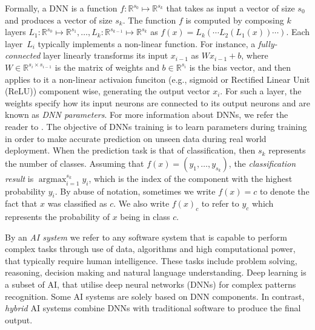 \documentclass[10pt, conference, a4paper, final]{IEEEtran}
\begin{document}
Formally, a DNN is a function $f\colon\mathbb{R}^{s_0}\mapsto \mathbb{R}^{s_k}$ that takes as input a vector of size $s_0$ and produces a vector of size $s_k$. The function $f$ is computed by composing $k$ layers $L_1\colon\mathbb{R}^{s_0} \mapsto\mathbb{R}^{s_1}, \dots, L_k\colon\mathbb{R}^{s_{k-1}}\mapsto\mathbb{R}^{s_k}$ as $f(x) = L_k(\cdots L_2(L_1(x))\cdots)$.
%
Each layer~$L_i$ typically implements a non-linear function. For instance, a \emph{fully-connected} layer linearly transforms its input $x_{i-1}$ as $W x_{i-1} + b$, where $W\in\mathbb{R}^{s_{i} \times s_{i-1}}$ is the matrix of weights and $b\in\mathbb{R}^{s_i}$ is the bias vector, and then applies to it a non-linear activaion funciton (e.g., sigmoid or Rectified Linear Unit (ReLU)) component wise, generating the output vector $x_i$. For such a layer, the weights specify how its input neurons are connected to its output neurons and are known as \emph{DNN parameters}. For more information about DNNs, we refer the reader to \cite{dnn_archi,Hassija, Liang}.
%
The objective of DNNs training is to learn parameters during training in order to make accurate prediction on unseen data during real world deployment.
%
When the prediction task is that of classification, then $s_k$ represents the number of classes. Assuming that $f(x) = (y_1,\dots,y_{s_k})$, the \emph{classification result} is $\displaystyle\mathop{\text{argmax}}_{i=1}^{s_k} y_i$, which is the index of the component with the highest probability $y_i$. By abuse of notation, sometimes we write $f(x)=c$ to denote the fact that $x$ was classified as $c$. We also write $f(x)_c$ to refer to $y_c$ which represents the probability of $x$ being in class $c$.



By an \emph{AI system} we refer to any software system that is capable to perform complex tasks through use of data, algorithms and high computational power, that typically require human intelligence. These tasks include problem solving, reasoning, decision making and natural language understanding.
%
Deep learning is a subset of AI, that utilise  deep neural networks (DNNs) for complex patterns recognition. Some AI systems are solely based on DNN components. In contrast, \emph{hybrid} AI systems combine DNNs with traditional software to produce the final output.
\end{document}
